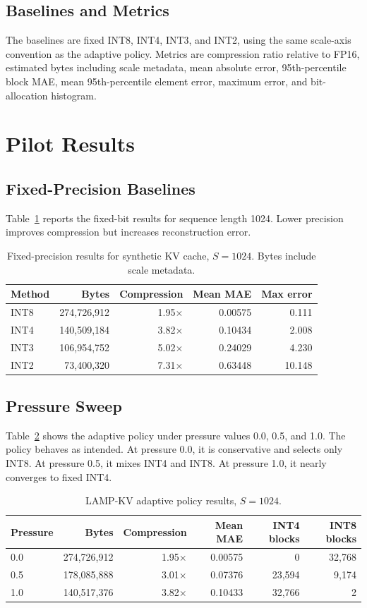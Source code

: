 \documentclass[11pt]{article}
\begin{document}
\subsection{Baselines and Metrics}
The baselines are fixed INT8, INT4, INT3, and INT2, using the same scale-axis convention as the adaptive policy. Metrics are compression ratio relative to FP16, estimated bytes including scale metadata, mean absolute error, 95th-percentile block MAE, mean 95th-percentile element error, maximum error, and bit-allocation histogram.

\section{Pilot Results}
\subsection{Fixed-Precision Baselines}
Table~\ref{tab:fixed} reports the fixed-bit results for sequence length 1024. Lower precision improves compression but increases reconstruction error.

\begin{table}[h]
\centering
\caption{Fixed-precision results for synthetic KV cache, $S=1024$. Bytes include scale metadata.}
\label{tab:fixed}
\begin{tabular}{lrrrr}
\toprule
Method & Bytes & Compression & Mean MAE & Max error \\
\midrule
INT8 & 274,726,912 & 1.95$\times$ & 0.00575 & 0.111 \\
INT4 & 140,509,184 & 3.82$\times$ & 0.10434 & 2.008 \\
INT3 & 106,954,752 & 5.02$\times$ & 0.24029 & 4.230 \\
INT2 & 73,400,320 & 7.31$\times$ & 0.63448 & 10.148 \\
\bottomrule
\end{tabular}
\end{table}

\subsection{Pressure Sweep}
Table~\ref{tab:adaptive} shows the adaptive policy under pressure values 0.0, 0.5, and 1.0. The policy behaves as intended. At pressure 0.0, it is conservative and selects only INT8. At pressure 0.5, it mixes INT4 and INT8. At pressure 1.0, it nearly converges to fixed INT4.

\begin{table}[h]
\centering
\caption{LAMP-KV adaptive policy results, $S=1024$.}
\label{tab:adaptive}
\begin{tabular}{lrrrrr}
\toprule
Pressure & Bytes & Compression & Mean MAE & INT4 blocks & INT8 blocks \\
\midrule
0.0 & 274,726,912 & 1.95$\times$ & 0.00575 & 0 & 32,768 \\
0.5 & 178,085,888 & 3.01$\times$ & 0.07376 & 23,594 & 9,174 \\
1.0 & 140,517,376 & 3.82$\times$ & 0.10433 & 32,766 & 2 \\
\bottomrule
\end{tabular}
\end{table}
\end{document}
